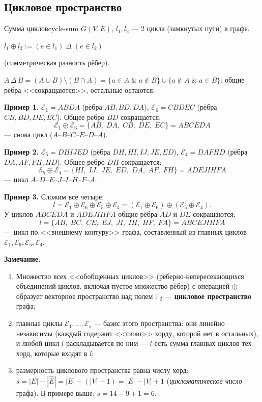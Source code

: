 \subsection*{Цикловое пространство}

\begin{defn}{Сумма циклов}{cycle-sum}
$G(V, E)$,\; $l_1, l_2$ --- 2 цикла (замкнутых пути) в графе.

$l_1 \oplus l_2 := (e \in l_1) \;\Delta\; (e \in l_2)$

\quad (симметрическая разность рёбер).
\end{defn}

$A \,\Delta\, B = (A \cup B) \setminus (B \cap A) = 
\{a \in A \;\&\; a \notin B\} \cup \{a \notin A \;\&\; a \in B\}$:
общие рёбра <<сокращаются>>, остальные остаются.

\medskip
\noindent\textbf{Пример 1.} $\mathcal{E}_1 = ABDA$ (рёбра $AB, BD, DA$),
$\mathcal{E}_6 = CBDEC$ (рёбра $CB, BD, DE, EC$). Общее ребро $BD$
сокращается:
\[
  \mathcal{E}_1 \oplus \mathcal{E}_6
  = \{AB,\; DA,\; CB,\; DE,\; EC\}
  = ABCEDA
\]
--- снова цикл ($A$--$B$--$C$--$E$--$D$--$A$).

\medskip
\noindent\textbf{Пример 2.} $\mathcal{E}_5 = DHIJED$ (рёбра
$DH, HI, IJ, JE, ED$), $\mathcal{E}_4 = DAFHD$ (рёбра $DA, AF, FH, HD$).
Общее ребро $DH$ сокращается:
\[
  \mathcal{E}_5 \oplus \mathcal{E}_4
  = \{HI,\; IJ,\; JE,\; ED,\; DA,\; AF,\; FH\}
  = ADEJIHFA
\]
--- цикл $A$--$D$--$E$--$J$--$I$--$H$--$F$--$A$.

\medskip
\noindent\textbf{Пример 3.} Сложим все четыре:
\[
  l = \mathcal{E}_1 \oplus \mathcal{E}_6 \oplus \mathcal{E}_5 \oplus \mathcal{E}_4
  = (\mathcal{E}_1 \oplus \mathcal{E}_6) \oplus (\mathcal{E}_5 \oplus \mathcal{E}_4).
\]
У циклов $ABCEDA$ и $ADEJIHFA$ общие рёбра $AD$ и $DE$ сокращаются:
\[
  l = \{AB,\; BC,\; CE,\; EJ,\; JI,\; IH,\; HF,\; FA\} = ABCEJIHFA
\]
--- цикл по <<внешнему контуру>> графа, составленный из главных циклов
$\mathcal{E}_1, \mathcal{E}_6, \mathcal{E}_5, \mathcal{E}_4$.

\medskip
\textbf{Замечание.}
\begin{enumerate}[label=\alph*)]
  \item Множество всех <<обобщённых циклов>> (рёберно-непересекающихся
        объединений циклов, включая пустое множество рёбер) с операцией
        $\oplus$ образует векторное пространство над полем $\mathbb{F}_2$
        --- \textbf{цикловое пространство} графа;
  \item главные циклы $\mathcal{E}_1, \ldots, \mathcal{E}_s$ --- базис
        этого пространства: они линейно независимы (каждый содержит
        <<свою>> хорду, которой нет в остальных), и любой цикл $l$
        раскладывается по ним --- $l$ есть сумма главных циклов тех
        хорд, которые входят в $l$;
  \item размерность циклового пространства равна числу хорд:
        $s = |E| - |\hat E| = |E| - (|V| - 1) = |E| - |V| + 1$
        (\emph{цикломатическое число} графа). В примере выше:
        $s = 14 - 9 + 1 = 6$.
\end{enumerate}

